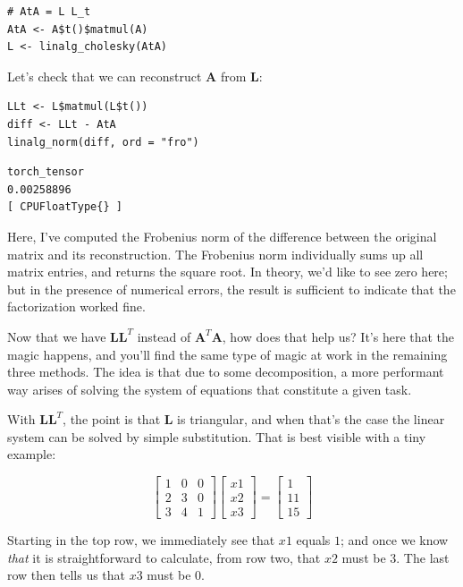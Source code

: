 \documentclass[
  letterpaper,
]{krantz}
\begin{document}
\begin{verbatim}
# AtA = L L_t
AtA <- A$t()$matmul(A)
L <- linalg_cholesky(AtA)
\end{verbatim}

Let's check that we can reconstruct \(\mathbf{A}\) from \(\mathbf{L}\):

\begin{verbatim}
LLt <- L$matmul(L$t())
diff <- LLt - AtA
linalg_norm(diff, ord = "fro")
\end{verbatim}

\begin{verbatim}
torch_tensor
0.00258896
[ CPUFloatType{} ]
\end{verbatim}

Here, I've computed the Frobenius norm of the difference between the
original matrix and its reconstruction. The Frobenius norm individually
sums up all matrix entries, and returns the square root. In theory, we'd
like to see zero here; but in the presence of numerical errors, the
result is sufficient to indicate that the factorization worked fine.

Now that we have \(\mathbf{L}\mathbf{L}^T\) instead of
\(\mathbf{A}^T\mathbf{A}\), how does that help us? It's here that the
magic happens, and you'll find the same type of magic at work in the
remaining three methods. The idea is that due to some decomposition, a
more performant way arises of solving the system of equations that
constitute a given task.

With \(\mathbf{L}\mathbf{L}^T\), the point is that \(\mathbf{L}\) is
triangular, and when that's the case the linear system can be solved by
simple substitution. That is best visible with a tiny example:

\[
\begin{bmatrix}
  1 & 0 & 0\\
  2 & 3 & 0\\
  3 & 4 & 1
\end{bmatrix}
\begin{bmatrix}
  x1\\
  x2\\
  x3
\end{bmatrix}
=
\begin{bmatrix}
  1\\
  11\\
  15
\end{bmatrix}
\]

Starting in the top row, we immediately see that \(x1\) equals \(1\);
and once we know \emph{that} it is straightforward to calculate, from
row two, that \(x2\) must be \(3\). The last row then tells us that
\(x3\) must be \(0\).
\end{document}
